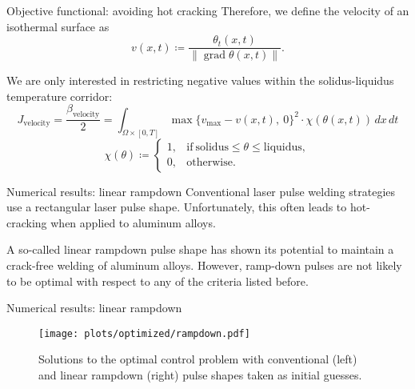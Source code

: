 \documentclass[
	9pt,
	hyperref = {unicode,pdfpagelabels=false},
	notheorems,
	aspectratio=169
	]{beamer}
\DeclareMathOperator{\grad}{grad}
\begin{document}
\begin{frame}{Objective functional: avoiding hot cracking}
	Therefore, we define the velocity of an isothermal surface as
	\begin{equation}
		v(x,t) \coloneqq \frac{\theta_t(x,t)}{\|\grad \theta(x,t)\|}.
	\end{equation}

	We are only interested in restricting negative values within the solidus-liquidus temperature corridor:
	\begin{equation}
		J_{\text{velocity}} = \frac{\beta_\text{velocity}}{2} =
		\int_{\Omega \times [0,T]} \max \{ v_{\max} - v(x,t),\ 0 \}^2 \cdot \chi(\theta(x,t))\, dx\,dt
	\end{equation}
	\begin{equation}
		\chi(\theta) \coloneqq \left\{
			\begin{array}{ll}
				1, & \text{if}\ \text{solidus} \le \theta \le \text{liquidus}, \\
				0, & \text{otherwise}.
			\end{array} \right.
	\end{equation}
\end{frame}


\begin{frame}{Numerical results: linear rampdown}
	Conventional laser pulse welding strategies use a rectangular laser pulse shape.
	Unfortunately, this often leads to hot-cracking when applied to aluminum alloys.

	A so-called linear rampdown pulse shape has shown its potential to maintain a crack-free welding of aluminum alloys.
	However, ramp-down pulses are not likely to be optimal with respect to any of the criteria listed before.
	\begin{table}
		\centering
		
		\caption{Numerical report on simulations with the conventional and the linear rampdown pulse shapes, and based on them optimized * pulse shapes.}
		\label{tab:rampdown}
	\end{table}
\end{frame}


\begin{frame}{Numerical results: linear rampdown}
	\begin{figure} 
		\centering
		\texttt{[image: plots/optimized/rampdown.pdf]}
		\caption{Solutions to the optimal control problem with conventional (left) and linear rampdown (right) pulse shapes taken as initial guesses.}
		\label{fig:rampdown}
	\end{figure}
\end{frame}
\end{document}
